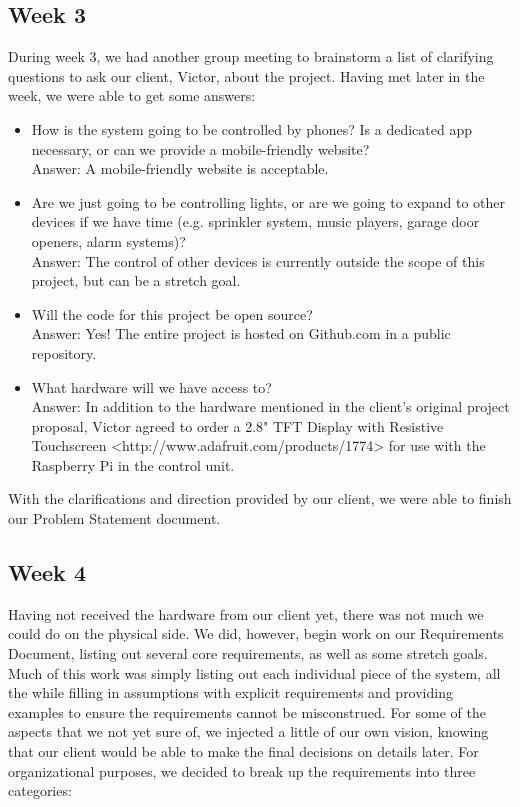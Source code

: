 \documentclass[letterpaper,10pt]{article}
\begin{document}
\subsection{Week 3}

During week 3, we had another group meeting to brainstorm a list of clarifying
questions to ask our client, Victor, about the project.  Having met later in
the week, we were able to get some answers:

\begin{itemize}
    \item How is the system going to be controlled by phones?  Is a dedicated
        app necessary, or can we provide a mobile-friendly website?\\ Answer: A
        mobile-friendly website is acceptable.
    \item Are we just going to be controlling lights, or are we going to expand
        to other devices if we have time (e.g. sprinkler system, music players,
        garage door openers, alarm systems)?\\
        Answer: The control of other devices is currently outside the scope of
        this project, but can be a stretch goal.
    \item Will the code for this project be open source?\\
        Answer: Yes!  The entire project is hosted on Github.com in a public
        repository.
    \item What hardware will we have access to?\\
        Answer: In addition to the hardware mentioned in the client's original
        project proposal, Victor agreed to order a 2.8" TFT Display with
        Resistive Touchscreen <http://www.adafruit.com/products/1774> for use
        with the Raspberry Pi in the control unit.
\end{itemize}

With the clarifications and direction provided by our client, we were able to finish our Problem Statement document.

\subsection{Week 4}
 
Having not received the hardware from our client yet, there was not much we
could do on the physical side.  We did, however, begin work on our Requirements
Document, listing out several core requirements, as well as some stretch goals.
Much of this work was simply listing out each individual piece of the system,
all the while filling in assumptions with explicit requirements and providing
examples to ensure the requirements cannot be misconstrued.  For some of the
aspects that we not yet sure of, we injected a little of our own vision,
knowing that our client would be able to make the final decisions on details
later.  For organizational purposes, we decided to break up the requirements
into three categories:
\end{document}
